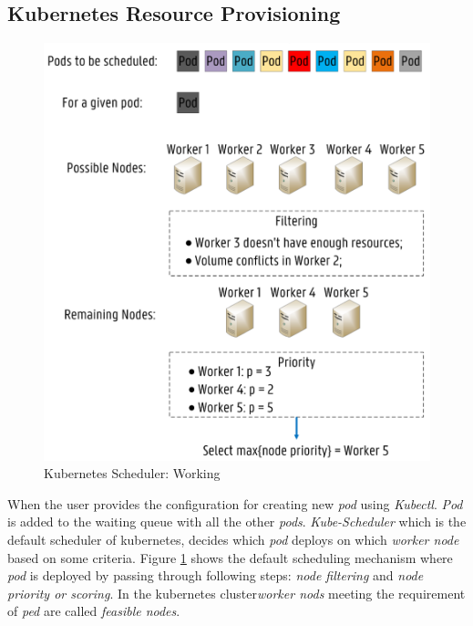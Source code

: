 \subsection{Kubernetes Resource Provisioning}
\label{sec:k8s_scheduler}
\begin{figure}
  \centering
  \includegraphics[width=\linewidth]{figures/mlcn-k8s-scheduler.pdf}
  \caption{Kubernetes Scheduler: Working\cite{Santos2019}}
  \label{fig:k8s-sch}
\end{figure}
When the user provides the configuration for creating new \emph{pod} using \emph{Kubectl}. \emph{Pod} is added to the waiting queue with all the other \emph{pods}. \emph{Kube-Scheduler} which is the default scheduler of kubernetes, decides which \emph{pod} deploys on which \emph{worker node} based on some criteria. Figure \ref{fig:k8s-sch} shows the default scheduling mechanism where \emph{pod} is deployed by passing through following steps: \emph{node filtering} and \emph{node priority or scoring}\cite{Santos2019}. In the kubernetes cluster\emph{worker nods} meeting the requirement of \emph{ped} are called \emph{feasible nodes}\cite{k8s}.
